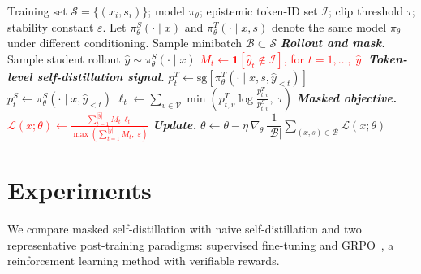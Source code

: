 \documentclass[11pt]{article}
\begin{document}
\begin{algorithm}[t]
\caption{Masked Self-Distillation}
\label{alg:masked_opsd}
\small
\begin{algorithmic}[1]
\setlength{\itemsep}{2pt}
\Require Training set $\mathcal{S}=\{(x_i,s_i)\}$; model $\pi_\theta$; epistemic token-ID set $\mathcal{I}$; clip threshold $\tau$; stability constant $\varepsilon$.
\State Let $\pi_\theta^{S}(\cdot \mid x)$ and $\pi_\theta^{T}(\cdot \mid x, s)$ denote the same model $\pi_\theta$ under different conditioning.
    \State Sample minibatch $\mathcal{B} \subset \mathcal{S}$
        \Statex \textbf{\textit{Rollout and mask.}}
        \State Sample student rollout $\hat{y} \sim \pi_\theta^{S}(\cdot \mid x)$
        \State \textcolor{red}{$M_t \gets \mathbf{1}[\hat{y}_t \notin \mathcal{I}]$, for $t = 1, \dots, |\hat{y}|$}
               \Comment{\textcolor{red}{mask}}
        \Statex \textbf{\textit{Token-level self-distillation signal.}}
            \State $p^{T}_t \gets \mathrm{sg}\!\left[\pi_\theta^{T}(\cdot \mid x, s, \hat{y}_{<t})\right]$
            \State $p^{S}_t \gets \pi_\theta^{S}(\cdot \mid x, \hat{y}_{<t})$
            \State $\ell_t \gets \displaystyle\sum_{v \in \mathcal{V}}
                   \min\!\left(p^{T}_{t,v}\log\tfrac{p^{T}_{t,v}}{p^{S}_{t,v}},\; \tau\right)$
        \EndFor
        \Statex \textbf{\textit{Masked objective.}}
        \State \textcolor{red}{$\displaystyle
                   \mathcal{L}(x;\theta) \gets
                   \frac{\sum_{t=1}^{|\hat{y}|} M_t\, \ell_t}
                        {\max\!\left(\sum_{t=1}^{|\hat{y}|} M_t,\; \varepsilon\right)}$}
    \EndFor
    \Statex \textbf{\textit{Update.}}
    \State $\theta \gets \theta - \eta\, \nabla_\theta\,
           \dfrac{1}{|\mathcal{B}|}\!\sum_{(x,s) \in \mathcal{B}} \mathcal{L}(x;\theta)$
\EndWhile
\end{algorithmic}
\end{algorithm}

\section{Experiments}
We compare masked self-distillation with naive self-distillation and two representative post-training paradigms: supervised fine-tuning and GRPO~\cite{shao2024deepseekmath}, a reinforcement learning method with verifiable rewards.
\end{document}
